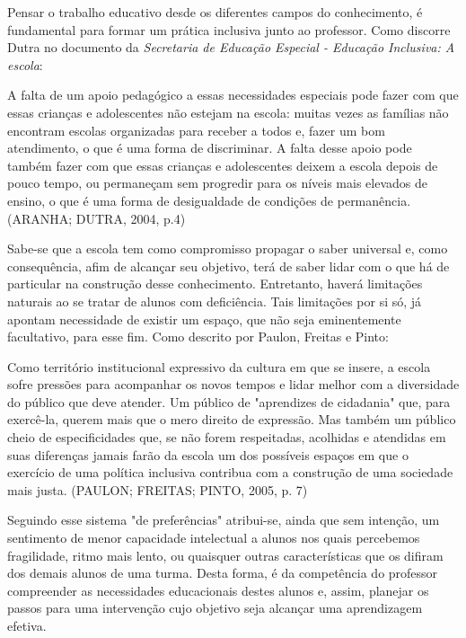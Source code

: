 \documentclass[brasil]{abnt}
\begin{document}
	Pensar o trabalho educativo desde os diferentes campos do 
	conhecimento, é fundamental para formar um prática inclusiva junto 
	ao professor. Como discorre Dutra no documento da \textit{Secretaria 
	de Educação Especial - Educação Inclusiva: A escola}:
	
		\begin{citacao} A falta de um apoio pedagógico a essas necessidades especiais pode fazer com que essas crianças e adolescentes não estejam na escola: muitas vezes as famílias não encontram escolas 
						organizadas para receber a todos e, fazer um bom atendimento, o que é uma forma de discriminar. A falta desse apoio pode também fazer com que essas crianças e adolescentes deixem a 
						escola depois de pouco tempo, ou permaneçam sem progredir para os níveis mais elevados de ensino, o que é uma forma de desigualdade de condições de permanência. 
						(ARANHA; DUTRA, 2004, p.4)
		\end{citacao}

	Sabe-se que a escola tem como compromisso propagar o saber universal e, como consequência, afim de alcançar seu objetivo, terá de saber lidar com o que há de particular na construção desse conhecimento. 
	Entretanto, haverá limitações naturais ao se tratar de alunos com deficiência. Tais limitações por si só, já apontam necessidade de existir um espaço, que não seja eminentemente facultativo, para esse fim.
	Como descrito por Paulon, Freitas e Pinto:
		
		\begin{citacao}Como território institucional expressivo da cultura em que se insere, a escola sofre pressões para acompanhar os novos tempos e lidar melhor com a diversidade do público que deve atender. 
						Um público de "aprendizes de cidadania" que, para exercê-la, querem mais que o mero direito de expressão. Mas também um público cheio de especificidades que, se não forem respeitadas, 
						acolhidas e atendidas em suas diferenças jamais farão da escola um dos possíveis espaços em que o exercício de uma política inclusiva contribua com a construção de uma sociedade mais 
						justa. (PAULON; FREITAS; PINTO, 2005, p. 7)
		\end{citacao}
	
	
	Seguindo esse sistema "de preferências" atribui-se, ainda que sem intenção, um sentimento de menor capacidade intelectual a alunos nos quais percebemos fragilidade, ritmo mais lento, 
	ou quaisquer outras características que os difiram dos demais alunos de uma turma. 
	Desta forma, é da competência do professor compreender as necessidades educacionais destes alunos e, assim, planejar os passos para uma intervenção cujo objetivo seja 
	alcançar uma aprendizagem efetiva.
	
\end{document}
